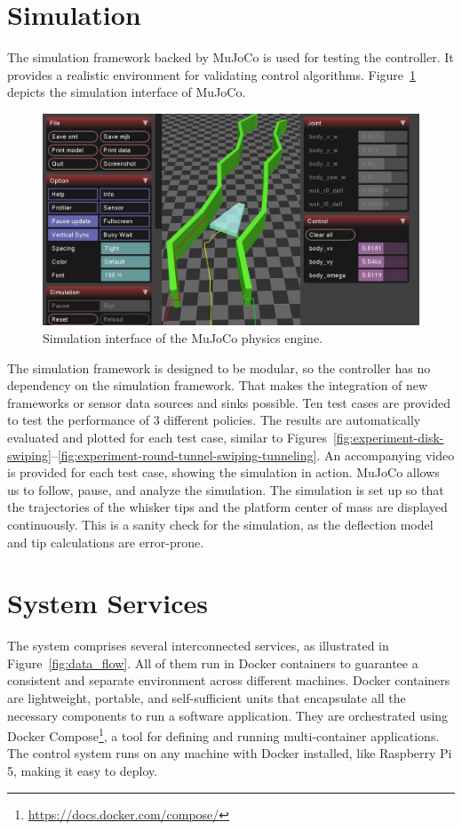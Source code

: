 \section{Simulation}
The simulation framework backed by MuJoCo is used for testing the controller.
It provides a realistic environment for validating control algorithms.
Figure~\ref{fig:mujoco} depicts the simulation interface of MuJoCo.

\begin{figure}
    \centering
    \includegraphics[width=\textwidth]{figures/mujoco}
    \caption{Simulation interface of the MuJoCo physics engine.}
    \label{fig:mujoco}
\end{figure}

The simulation framework is designed to be modular, so the controller has no dependency on the simulation framework.
That makes the integration of new frameworks or sensor data sources and sinks possible.
Ten test cases are provided to test the performance of 3 different policies.
The results are automatically evaluated and plotted for each test case, similar to Figures~\ref{fig:experiment-disk-swiping}--\ref{fig:experiment-round-tunnel-swiping-tunneling}.
An accompanying video is provided for each test case, showing the simulation in action.
MuJoCo allows us to follow, pause, and analyze the simulation.
The simulation is set up so that the trajectories of the whisker tips and the platform center of mass are displayed continuously.
This is a sanity check for the simulation, as the deflection model and tip calculations are error-prone.


\section{System Services}
The system comprises several interconnected services, as illustrated in Figure~\ref{fig:data_flow}.
All of them run in Docker containers to guarantee a consistent and separate environment across different machines.
Docker containers are lightweight, portable, and self-sufficient units that encapsulate all the necessary components to run a software application.
They are orchestrated using Docker Compose\footnote{\url{https://docs.docker.com/compose/}}, a tool for defining and running multi-container applications.
The control system runs on any machine with Docker installed, like Raspberry Pi 5, making it easy to deploy.

